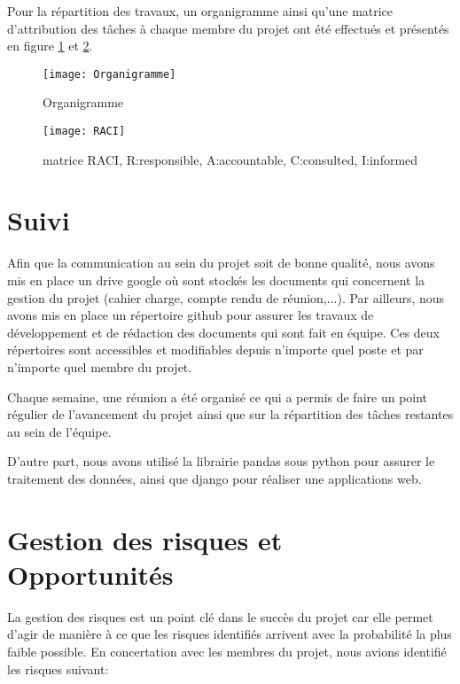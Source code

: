 Pour la répartition des travaux, un organigramme ainsi qu'une matrice d'attribution des tâches à chaque membre du projet ont été effectués et présentés en figure \ref{fig:Organigramme} et \ref{fig:raci}.

\begin{figure}[!ht]
	\centering
	\texttt{[image: Organigramme]}
	\caption{Organigramme}
	\label{fig:Organigramme}
\end{figure}

\begin{figure}[!h]
	\centering
	\texttt{[image: RACI]}
	\caption{matrice RACI, R:responsible, A:accountable, C:consulted, I:informed}
	\label{fig:raci}
\end{figure}



\section*{Suivi}
Afin que la communication au sein du projet soit de bonne qualité, nous avons mis en place un drive google où sont stockés les documents qui concernent la gestion du projet (cahier charge, compte rendu de réunion,...). Par ailleurs, nous avons mis en place un répertoire github pour assurer les travaux de développement et de rédaction des documents qui sont fait en équipe. Ces deux répertoires sont accessibles et modifiables depuis n'importe quel poste et par n'importe quel membre du projet. 

Chaque semaine, une réunion a été organisé ce qui a permis de faire un point régulier de l'avancement du projet ainsi que sur la répartition des tâches restantes au sein de l'équipe. 

D'autre part, nous avons utilisé la librairie pandas sous python pour assurer le traitement des données, ainsi que django pour réaliser une  applications web. 



\section*{Gestion des risques et Opportunités}
La gestion des risques est un point clé dans le succès du projet car elle permet d'agir de manière à ce que les risques identifiés arrivent avec la probabilité la plus faible possible. En concertation avec les membres du projet, nous avions identifié les risques suivant:


